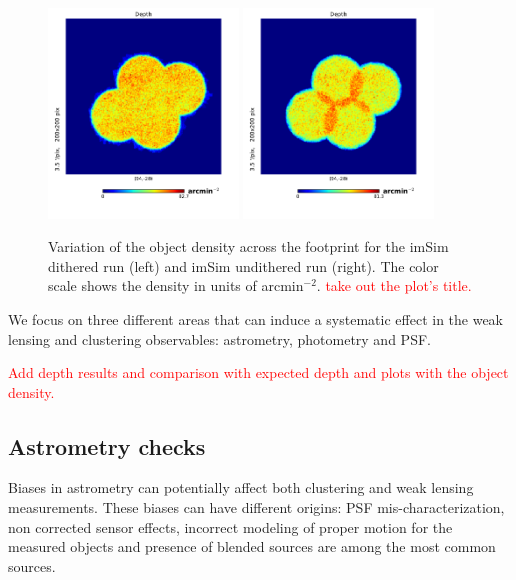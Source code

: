 \documentclass[\docopts]{\docclass}
\begin{document}
\begin{figure}
  \centering
  \includegraphics[width=0.45\textwidth]{density_map_dithered}
  \includegraphics[width=0.45\textwidth]{density_map_undithered}
  \caption{Variation of the object density across the footprint for the imSim dithered run (left) and imSim undithered run
  (right). The color scale shows the density in units of arcmin$^{-2}$. \textcolor{red}{take out the plot's title.}}
  \label{fig:density_footprint}
\end{figure}

We focus on three different areas that can induce a systematic effect in the weak lensing and clustering observables:
astrometry, photometry and PSF.


\textcolor{red}{Add depth results and comparison with expected depth and plots with the object density.}

\subsection{Astrometry checks}
\label{sec:astrometry_checks}

Biases in astrometry can potentially affect both clustering and weak lensing measurements. These biases
can have different origins: PSF mis-characterization, non corrected sensor effects, incorrect modeling of proper
motion for the measured objects and presence of blended sources are among the most common sources.
\end{document}

